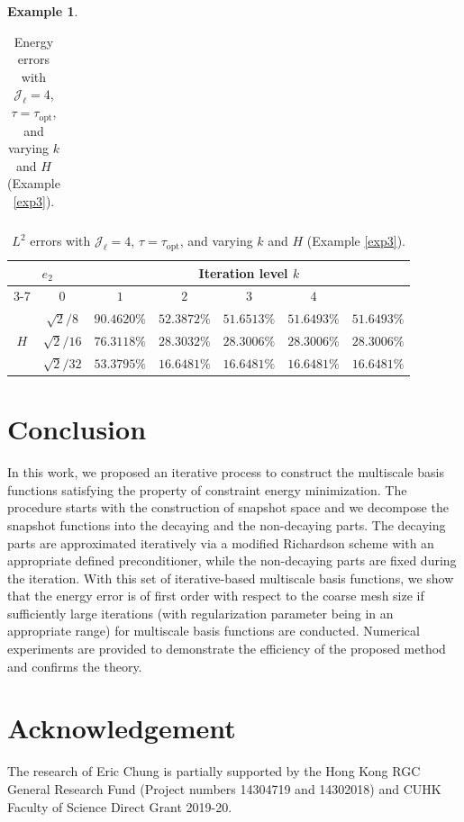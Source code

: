 \documentclass{article}[11pt]
\theoremstyle{definition}
\newtheorem{exmp}{Example}[section]
\begin{document}
\begin{exmp}
\begin{table}[ht]
\begin{tabular}{cc||ccccc}
\hline
\end{tabular}
\caption{Energy errors with $\mathcal{J}_{\ell} = 4$, $\tau = \tau_{\text{opt}}$, and varying $k$ and $H$ (Example \ref{exp3}).}
\label{tab:exp3-v-3}
\end{table}

\begin{table}[ht]
\centering
\begin{tabular}{cc||ccccc}
\hline
\multicolumn{2}{c||}{\multirow{2}{*}{$e_2$}}   & \multicolumn{5}{c}{Iteration level $k$}           \\ \cline{3-7} 
\multicolumn{2}{c||}{} &   $0$ & $1$   & $2$   & $3$   & $4$   \\ 
\hline \hline
\multicolumn{1}{c|}{\multirow{3}{*}{$H$}} & 
$\sqrt{2}/8$ & $90.4620\%$ & $52.3872\%$ & $51.6513\%$ & $51.6493\%$ & $51.6493\%$ \\
\multicolumn{1}{c|}{} &  
 $\sqrt{2}/16$ & $76.3118\%$ & $28.3032\%$ & $28.3006\%$ & $28.3006\%$ & $28.3006\%$ \\

\multicolumn{1}{c|}{} &  
 $\sqrt{2}/32$ & $53.3795\%$ & $16.6481\%$ & $16.6481\%$ & $16.6481\%$ & $16.6481\%$ \\

\hline
\end{tabular}
\caption{$L^2$ errors with $\mathcal{J}_{\ell} = 4$, $\tau = \tau_{\text{opt}}$, and varying $k$ and $H$ (Example \ref{exp3}).}
\label{tab:exp3-p-3}
\end{table}
\end{exmp}

\section{Conclusion} \label{sec:conclusion}
In this work, we proposed an iterative process to construct the multiscale basis functions satisfying the property of constraint energy minimization. The procedure starts with the construction of snapshot space and we decompose the snapshot functions into the decaying and the non-decaying parts. The decaying parts are approximated iteratively via a modified Richardson scheme with an appropriate defined preconditioner, while the non-decaying parts are fixed during the iteration. 
With this set of iterative-based multiscale basis functions, we show that the energy error is of first order with respect to the coarse mesh size if sufficiently large iterations (with regularization parameter being in an appropriate range) for multiscale basis functions are conducted. Numerical experiments are provided to demonstrate the efficiency of the proposed method and confirms the theory. 

\section*{Acknowledgement}

The research of Eric Chung is partially supported by the Hong
 Kong RGC General Research Fund (Project numbers 14304719 and 14302018)
 and CUHK Faculty of Science Direct Grant 2019-20.




\end{document}
